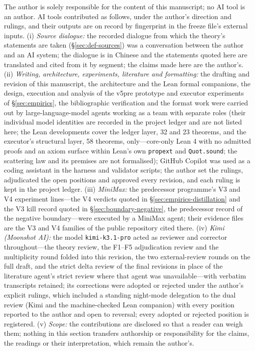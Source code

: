 \documentclass[11pt,a4paper]{article}
\begin{document}
The author is solely responsible for the content of this manuscript; no AI tool is an author. AI tools contributed as follows, under the author's direction and rulings, and their outputs are on record by fingerprint in the freeze file's external inputs. (i) \emph{Source dialogue:} the recorded dialogue from which the theory's statements are taken (\S\ref{sec:def-sources}) was a conversation between the author and an AI system; the dialogue is in Chinese and the statements quoted here are translated and cited from it by segment; the claims made here are the author's. (ii) \emph{Writing, architecture, experiments, literature and formatting:} the drafting and revision of this manuscript, the architecture and the Lean formal companions, the design, execution and analysis of the v5pre prototype and executor experiments of \S\ref{sec:empirics}, the bibliographic verification and the format work were carried out by large-language-model agents working as a team with separate roles (their individual model identities are recorded in the project ledger and are not listed here; the Lean developments cover the ledger layer, 32 and 23 theorems, and the executor's structural layer, 58 theorems, only---core-only Lean 4 with no admitted proofs and an axiom surface within Lean's own \texttt{propext} and \texttt{Quot.sound}; the scattering law and its premises are not formalised); GitHub Copilot was used as a coding assistant in the harness and validator scripts; the author set the rulings, adjudicated the open positions and approved every revision, and each ruling is kept in the project ledger. (iii) \emph{MiniMax:} the predecessor programme's V3 and V4 experiment lines---the V4 verdicts quoted in \S\ref{sec:empirics-distillation} and the V3 kill record quoted in \S\ref{sec:boundary-negative}, the predecessor record of the negative boundary---were executed by a MiniMax agent; their evidence files are the V3 and V4 families of the public repository cited there. (iv) \emph{Kimi (Moonshot AI):} the model \texttt{kimi-k3.1-pro} acted as reviewer and corrector throughout---the theory review, the F1--F5 adjudication review and the multiplicity round folded into this revision, the two external-review rounds on the full draft, and the strict delta review of the final revisions in place of the literature agent's strict review where that agent was unavailable---with verbatim transcripts retained; its corrections were adopted or rejected under the author's explicit rulings, which included a standing night-mode delegation to the dual review (Kimi and the machine-checked Lean companion) with every position reported to the author and open to reversal; every adopted or rejected position is registered. (v) \emph{Scope:} the contributions are disclosed so that a reader can weigh them; nothing in this section transfers authorship or responsibility for the claims, the readings or their interpretation, which remain the author's.



\end{document}
